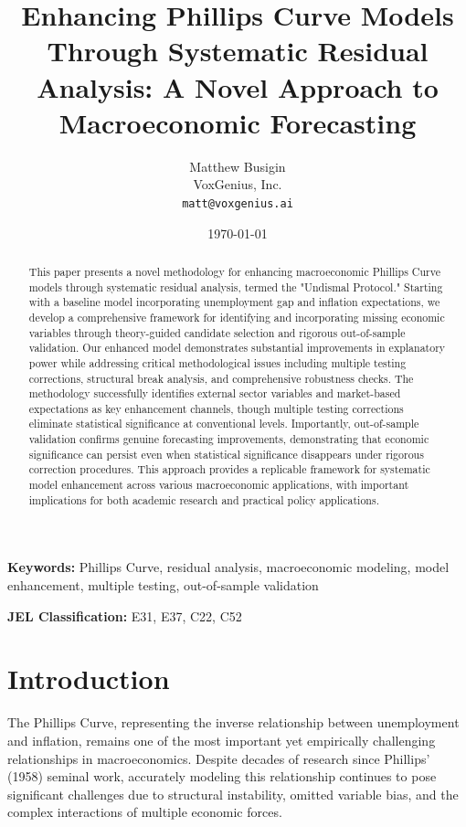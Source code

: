 \documentclass[12pt]{article}
\title{Enhancing Phillips Curve Models Through Systematic Residual Analysis: A Novel Approach to Macroeconomic Forecasting}
\author{Matthew Busigin\\
VoxGenius, Inc.\\
\texttt{matt@voxgenius.ai}}
\date{\today}
\begin{document}
\maketitle

\begin{abstract}
This paper presents a novel methodology for enhancing macroeconomic Phillips Curve models through systematic residual analysis, termed the "Undismal Protocol." Starting with a baseline model incorporating unemployment gap and inflation expectations, we develop a comprehensive framework for identifying and incorporating missing economic variables through theory-guided candidate selection and rigorous out-of-sample validation. Our enhanced model demonstrates substantial improvements in explanatory power while addressing critical methodological issues including multiple testing corrections, structural break analysis, and comprehensive robustness checks. The methodology successfully identifies external sector variables and market-based expectations as key enhancement channels, though multiple testing corrections eliminate statistical significance at conventional levels. Importantly, out-of-sample validation confirms genuine forecasting improvements, demonstrating that economic significance can persist even when statistical significance disappears under rigorous correction procedures. This approach provides a replicable framework for systematic model enhancement across various macroeconomic applications, with important implications for both academic research and practical policy applications.
\end{abstract}

\textbf{Keywords:} Phillips Curve, residual analysis, macroeconomic modeling, model enhancement, multiple testing, out-of-sample validation

\textbf{JEL Classification:} E31, E37, C22, C52

\section{Introduction}

The Phillips Curve, representing the inverse relationship between unemployment and inflation, remains one of the most important yet empirically challenging relationships in macroeconomics. Despite decades of research since Phillips' (1958) seminal work, accurately modeling this relationship continues to pose significant challenges due to structural instability, omitted variable bias, and the complex interactions of multiple economic forces.
\end{document}
